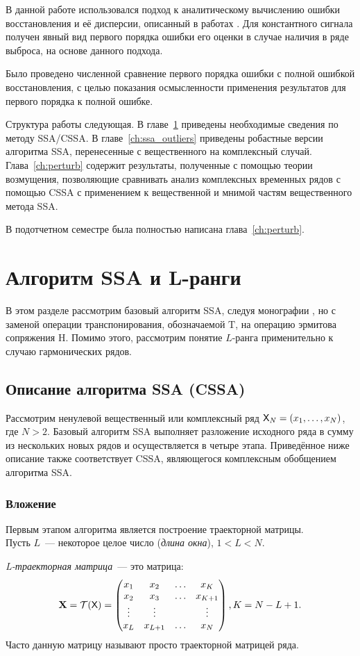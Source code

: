 \documentclass[specialist,
               substylefile = spbu.rtx,
               subf,href,colorlinks=true, 12pt]{disser}
\begin{document}
В данной работе использовался подход к аналитическому вычислению ошибки восстановления и её дисперсии, описанный в работах \cite{Nekr2008,Vlas2008}. Для константного сигнала получен явный вид первого порядка ошибки его оценки в случае наличия в ряде выброса, на основе данного подхода.

Было проведено численной сравнение первого порядка ошибки с полной ошибкой восстановления, с целью показания осмысленности применения результатов для первого порядка к полной ошибке.

Структура работы следующая. В главе~\ref{ch:ssa} приведены необходимые сведения по методу SSA/CSSA. В главе~\ref{ch:ssa_outliers} приведены робастные версии алгоритма SSA, перенесенные с вещественного на комплексный случай. Глава~\ref{ch:perturb} содержит результаты, полученные с помощью теории возмущения, позволяющие сравнивать анализ комплексных временных рядов с помощью CSSA с применением к вещественной и мнимой частям  вещественного метода SSA.

В подотчетном семестре была полностью написана глава~\ref{ch:perturb}.

\chapter{Алгоритм SSA и L-ранги}
\label{ch:ssa}
В этом разделе рассмотрим базовый алгоритм SSA, следуя монографии \cite{Golyandina.etal2001}, но с заменой операции транспонирования, обозначаемой $\mathrm{T}$, на операцию эрмитова сопряжения $\mathrm{H}$. Помимо этого, рассмотрим понятие $L$-ранга применительно к случаю гармонических рядов.
\section{Описание алгоритма SSA (CSSA)}
Рассмотрим ненулевой вещественный или комплексный ряд $\textsf{X}_N = (x_1, \ldots, x_{N})$, где $N > 2$. Базовый алгоритм SSA выполняет разложение исходного ряда в сумму из нескольких новых рядов и осуществляется в четыре этапа. Приведённое ниже описание также соответствует CSSA, являющегося комплексным обобщением алгоритма SSA.
\subsection{Вложение}
Первым этапом алгоритма является построение траекторной матрицы.\\
Пусть $L$~--- некоторое целое число (\textit{длина окна}), $1 < L < N$.

\textit{L-траекторная матрица}~--- это матрица:
$$\mathbf{X} = \mathcal{T}(\textsf{X}) = \begin{pmatrix}
           x_1 & x_2 & \ldots & x_{K}\\
           x_2 & x_3 & \ldots & x_{K+1}\\
           \vdots & \vdots & & \vdots\\
           x_{L} & x_{L+1} & \ldots & x_{N}
         \end{pmatrix}, K = N - L + 1.$$
Часто данную матрицу называют просто траекторной матрицей ряда.
\end{document}
